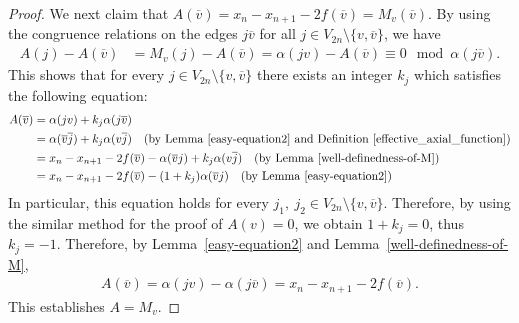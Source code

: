 \documentclass[12pt]{amsart}
\theoremstyle{remark}
\numberwithin{equation}{section}
\begin{document}
\begin{proof}
We next claim that $A(\overline{v})=x_{n}-x_{n+1}-2f(\overline{v})=M_{v}(\overline{v})$.
By using the congruence relations on the edges $j\overline{v}$ for all $j\in V_{2n}\setminus \{v,\overline{v}\}$, we have 
\begin{align*}
A(j)-A(\overline{v})&=M_{v}(j)-A(\overline{v}) 
=\alpha(jv)-A(\overline{v}) \equiv 0\mod \alpha(j\overline{v}).
\end{align*}
This shows that for every $j\in V_{2n}\setminus \{v,\overline{v}\}$ there exists an integer $k_{j}$ which satisfies the following equation:
\begin{align*}
A(\overline{v})&=\alpha(jv)+k_{j}\alpha(j\overline{v}) \\
&=\alpha(\overline{v}\overline{j})+k_{j}\alpha(v\overline{j}) \quad ({\rm by\ Lemma~\ref{easy-equation2}\ and\ Definition~\ref{effective_axial_function}}) \\
&=x_{n}-x_{n+1}-2f(\overline{v})-\alpha(\overline{v}j)+k_{j}\alpha(v\overline{j}) \quad ({\rm by\ Lemma~\ref{well-definedness-of-M}}) \\
&=x_{n}-x_{n+1}-2f(\overline{v})-(1+k_{j})\alpha(\overline{v}j) \quad ({\rm by\ Lemma~\ref{easy-equation2}})
\end{align*}
In particular, this equation holds for every $j_{1},\ j_{2} \in V_{2n}\setminus \{v,\overline{v}\}$.
Therefore, 
by using the similar method for the proof of $A(v)=0$, we obtain $1+k_{j}=0$, thus $k_{j}=-1$.
Therefore, by Lemma~\ref{easy-equation2} and Lemma~\ref{well-definedness-of-M},
\begin{align*}
A(\overline{v})=\alpha(jv)-\alpha(j\overline{v})=x_{n}-x_{n+1}-2f(\overline{v}).
\end{align*}
This establishes $A=M_{v}$.
\end{proof}
\end{document}
